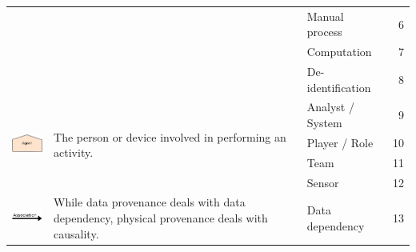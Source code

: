\begin{table}[!htb]
\begin{tabular}{p{2.2cm}p{5cm}p{4cm}r}
                             &                                                                                                                                & Manual process                                                                                  & 6  \\
                             &                                                                                                                                & Computation                                                                                     & 7  \\
                             &                                                                                                                                & De-identification                                                                               & 8  \\
\midrule
\multirow{4}{*}{\includegraphics[width=2.2cm]{figs/prov_symbols/prov-agent.png}}       & \multirow{4}{5cm}{The person or device involved in performing an activity.}                                                    & Analyst / System                                                                                & 9  \\
                             &                                                                                                                                & Player / Role                                                                                   & 10 \\
                             &                                                                                                                                & Team                                                                                            & 11 \\
                             &                                                                                                                                & Sensor                                                                                          & 12 \\
\midrule
\multirow{2}{*}{\includegraphics[width=2.2cm]{figs/prov_symbols/m_assoc_labelled.png}}  & \multirow{2}{5cm}{While data provenance deals with data dependency, physical provenance deals with causality.}                 & Data dependency                                                                                 & 13 \\

\end{tabular}
\end{table}
